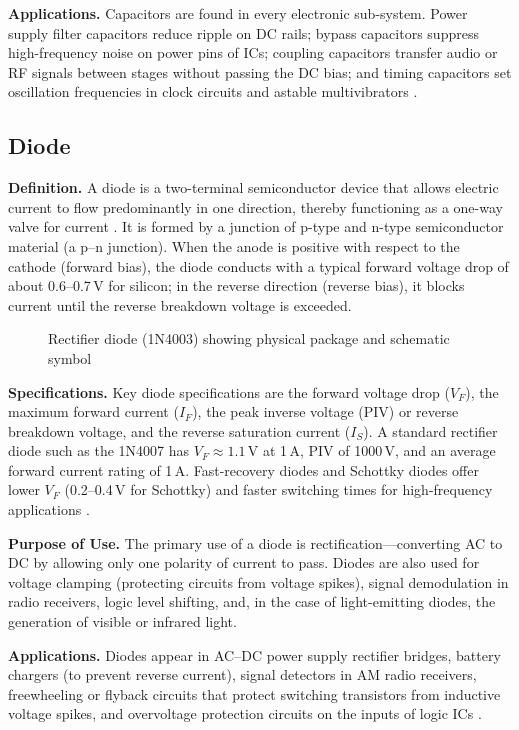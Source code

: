\documentclass[12pt, a4paper, twoside]{report}
\newcommand{\imgplaceholder}[2]{%
  \begin{figure}[H]
    \centering
    \fcolorbox{gray!60}{gray!12}{%
      \parbox[c][5cm][c]{0.65\textwidth}{%
        \centering
        \textcolor{gray!80}{\Large [Image Placeholder]}\\[6pt]
        \textcolor{gray}{\small Insert figure here}
      }%
    }
    \caption{#1}
    \label{fig:#2}
  \end{figure}
}
\begin{document}
\textbf{Applications.}\quad
Capacitors are found in every electronic sub-system. Power supply filter capacitors
reduce ripple on DC rails; bypass capacitors suppress high-frequency noise on power pins
of ICs; coupling capacitors transfer audio or RF signals between stages without
passing the DC bias; and timing capacitors set oscillation frequencies in clock circuits
and astable multivibrators \cite{horowitz2015}.

\subsection{Diode}

\textbf{Definition.}\quad
A diode is a two-terminal semiconductor device that allows electric current to flow
predominantly in one direction, thereby functioning as a one-way valve for current
\cite{boylestad2015}. It is formed by a junction of p-type and n-type semiconductor
material (a p--n junction). When the anode is positive with respect to the cathode
(forward bias), the diode conducts with a typical forward voltage drop of about 0.6--0.7\,V
for silicon; in the reverse direction (reverse bias), it blocks current until the reverse
breakdown voltage is exceeded.

\imgplaceholder{Rectifier diode (1N4003) showing physical package and schematic symbol}{diode}

\textbf{Specifications.}\quad
Key diode specifications are the forward voltage drop ($V_F$), the maximum forward
current ($I_F$), the peak inverse voltage (PIV) or reverse breakdown voltage, and the
reverse saturation current ($I_S$). A standard rectifier diode such as the 1N4007 has
$V_F \approx 1.1$\,V at 1\,A, PIV of 1000\,V, and an average forward current rating
of 1\,A. Fast-recovery diodes and Schottky diodes offer lower $V_F$ (0.2--0.4\,V for
Schottky) and faster switching times for high-frequency applications \cite{sedra2020}.

\textbf{Purpose of Use.}\quad
The primary use of a diode is rectification---converting AC to DC by allowing only
one polarity of current to pass. Diodes are also used for voltage clamping (protecting
circuits from voltage spikes), signal demodulation in radio receivers, logic level
shifting, and, in the case of light-emitting diodes, the generation of visible or infrared
light.

\textbf{Applications.}\quad
Diodes appear in AC--DC power supply rectifier bridges, battery chargers (to prevent
reverse current), signal detectors in AM radio receivers, freewheeling or flyback
circuits that protect switching transistors from inductive voltage spikes, and overvoltage
protection circuits on the inputs of logic ICs \cite{floyd2012}.
\end{document}

